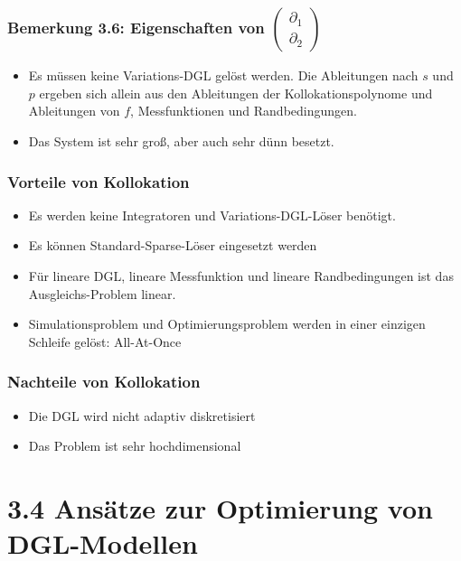 \subsubsection*{Bemerkung 3.6: Eigenschaften von $\begin{pmatrix} \partial_1 \\ \partial_2 \end{pmatrix}$}

\begin{itemize}
\item Es müssen keine Variations-DGL gelöst werden. Die Ableitungen nach $s$ und $p$ ergeben sich allein aus den Ableitungen der Kollokationspolynome und Ableitungen von $f$, Messfunktionen und Randbedingungen.
\item Das System ist sehr groß, aber auch sehr dünn besetzt.
\end{itemize}

\subsubsection*{Vorteile von Kollokation}

\begin{itemize}
\item Es werden keine Integratoren und Variations-DGL-Löser benötigt.
\item Es können Standard-Sparse-Löser eingesetzt werden
\item Für lineare DGL, lineare Messfunktion und lineare Randbedingungen ist das Ausgleichs-Problem linear.
\item Simulationsproblem und Optimierungsproblem werden in einer einzigen Schleife gelöst: All-At-Once
\end{itemize}

\subsubsection*{Nachteile von Kollokation}

\begin{itemize}
\item Die DGL wird nicht adaptiv diskretisiert
\item Das Problem ist sehr hochdimensional
\end{itemize}


\section*{3.4 Ansätze zur Optimierung von DGL-Modellen}

